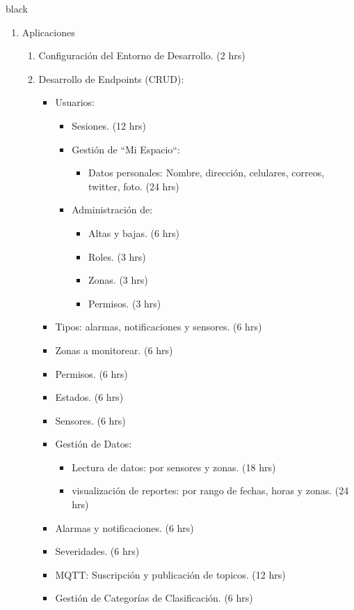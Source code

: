 \documentclass[11pt]{charter}
\begin{document}
\begin{consigna}{black}
\begin{enumerate}
\begin{enumerate}
\begin{itemize}
		\end{itemize}
	\end{enumerate}
\item Aplicaciones
	\begin{enumerate}
		\item Configuración del Entorno de Desarrollo. (2 hrs) 
		\item Desarrollo de Endpoints (CRUD):
		\begin{itemize}
			\item Usuarios:
			\begin{itemize}
				\item Sesiones. (12 hrs) 
				\item Gestión de ``Mi Espacio``:
				\begin{itemize}
					\item Datos personales: Nombre, dirección, celulares, correos, twitter, foto. (24 hrs) 
				\end{itemize}
				\item Administración de:
				\begin{itemize}
					\item Altas y bajas. (6 hrs) 
					\item Roles. (3 hrs) 
					\item Zonas. (3 hrs) 
					\item Permisos. (3 hrs) 
				\end{itemize}
			\end{itemize}
			\item Tipos: alarmas, notificaciones y sensores. (6 hrs) 
			\item Zonas a monitorear. (6 hrs) 
			\item Permisos. (6 hrs) 
			\item Estados. (6 hrs) 
			\item Sensores. (6 hrs) 
			\item Gestión de Datos:
			\begin{itemize}
				\item Lectura de datos: por sensores y zonas. (18 hrs) 
				\item visualización de reportes: por rango de fechas, horas y zonas. (24 hrs) 
			\end{itemize}
			\item Alarmas y notificaciones. (6 hrs) 
			\item Severidades. (6 hrs) 
			\item MQTT: Suscripción y publicación de topicos. (12 hrs) 
			\item Gestión de Categorías de Clasificación. (6 hrs) 

\end{itemize}
\end{enumerate}
\end{enumerate}
\end{consigna}
\end{document}
